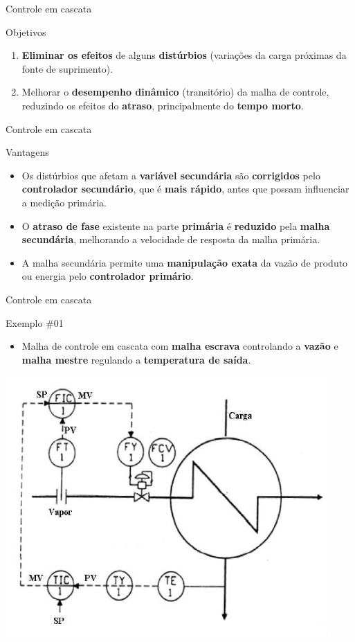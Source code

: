 \begin{frame}{Controle em cascata}
	\begin{block}{Objetivos}
		\begin{enumerate}
			\item \textbf{Eliminar os efeitos} de alguns \textbf{distúrbios} (variações da carga próximas da fonte de suprimento).
			\item Melhorar o \textbf{desempenho dinâmico} (transitório) da malha de controle, reduzindo os efeitos do \textbf{atraso}, principalmente do \textbf{tempo morto}.
		\end{enumerate}
	\end{block}
\end{frame}


\begin{frame}{Controle em cascata}
	\begin{block}{Vantagens}
		\begin{itemize}
			\item Os distúrbios que afetam a \textbf{variável secundária} são \textbf{corrigidos} pelo \textbf{controlador secundário}, que é \textbf{mais rápido}, antes que possam influenciar a medição primária.
			\item O \textbf{atraso de fase} existente na parte \textbf{primária} é \textbf{reduzido} pela \textbf{malha secundária}, melhorando a velocidade de resposta da malha primária.
			\item A malha secundária permite uma \textbf{manipulação exata} da vazão de produto ou energia pelo \textbf{controlador primário}.
		\end{itemize}
	\end{block}
\end{frame}


\begin{frame}{Controle em cascata}
	\begin{block}{Exemplo \#01}
		\begin{itemize}
			\item Malha de controle em cascata com \textbf{malha escrava} controlando a \textbf{vazão} e \textbf{malha mestre} regulando a \textbf{temperatura de saída}.
		\end{itemize}
	\end{block}

	\centering
	\includegraphics[width=0.6\linewidth]{Figuras/Ch15/fig4}
\end{frame}


